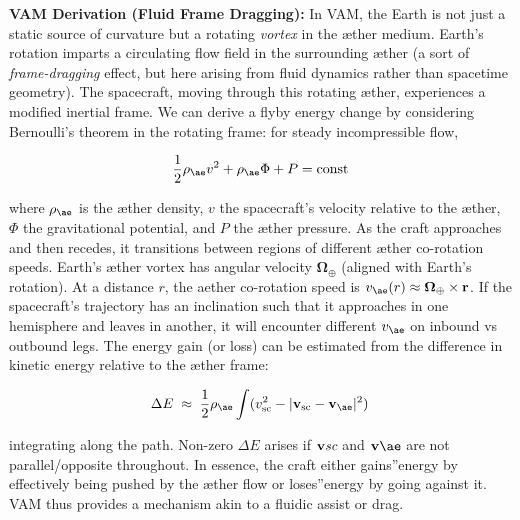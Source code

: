 \documentclass[a4paper, aps,preprint,superscriptaddress, 12pt]{revtex4}
\begin{document}
\textbf{VAM Derivation (Fluid Frame Dragging):} In VAM, the Earth is not just a static source of curvature but a rotating \textit{vortex} in the æther medium. Earth's rotation imparts a circulating flow field in the surrounding æther (a sort of \textit{frame-dragging} effect, but here arising from fluid dynamics rather than spacetime geometry). The spacecraft, moving through this rotating æther, experiences a modified inertial frame. We can derive a flyby energy change by considering Bernoulli's theorem in the rotating frame: for steady incompressible flow,

\begin{equation}
    \frac{1}{2}\rho_{\ae} v^2 + \rho_{\ae} \Phi + P = \text{const}
\end{equation}

where $\rho_{\ae}$ is the æther density, $v$ the spacecraft's velocity relative to the æther, $\Phi$ the gravitational potential, and $P$ the æther pressure. As the craft approaches and then recedes, it transitions between regions of different æther co-rotation speeds. Earth's æther vortex has angular velocity $\boldsymbol\Omega_{\oplus}$ (aligned with Earth's rotation). At a distance $r$, the aether co-rotation speed is $v_{\ae}(r)\approx \boldsymbol\Omega_{\oplus}\times \mathbf{r}$. If the spacecraft's trajectory has an inclination such that it approaches in one hemisphere and leaves in another, it will encounter different $v_{\ae}$ on inbound vs outbound legs. The energy gain (or loss) can be estimated from the difference in kinetic energy relative to the æther frame:

\begin{equation}
    \Delta E \;\approx\; \frac{1}{2} \rho_{\ae} \int (v_{\text{sc}}^2 - |\mathbf{v}_{\text{sc}}-\mathbf{v}_{\ae}|^2)\,
\end{equation}

integrating along the path. Non-zero $\Delta E$ arises if $\mathbf{v}\textit{\text{sc}}$ and $\mathbf{v}{\ae}$ are not parallel/opposite throughout. In essence, the craft either \grqq gains\textquotedblright energy by effectively being pushed by the æther flow or \grqq loses\textquotedblright energy by going against it. VAM thus provides a mechanism akin to a fluidic assist or drag.
\end{document}
